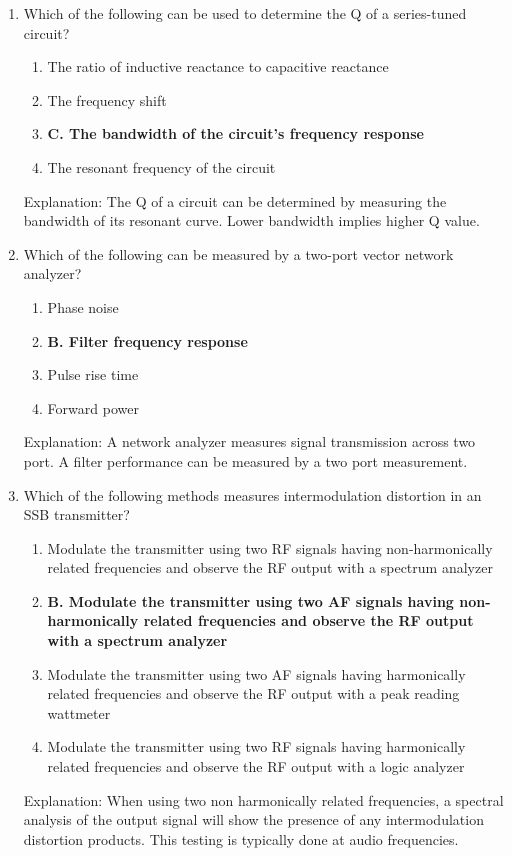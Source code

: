 \begin{enumerate}
      \item Which of the following can be used to determine the Q of a series-tuned circuit?
     \begin{enumerate}
       \item  The ratio of inductive reactance to capacitive reactance
       \item  The frequency shift
       \item \textbf{C. The bandwidth of the circuit's frequency response}
       \item  The resonant frequency of the circuit
        \end{enumerate}
       \textcolor{myred}{Explanation:}
    The Q of a circuit can be determined by measuring the bandwidth of its resonant curve. Lower bandwidth implies higher Q value.

        \item Which of the following can be measured by a two-port vector network analyzer?
      \begin{enumerate}
      \item  Phase noise
       \item \textbf{B. Filter frequency response}
      \item  Pulse rise time
        \item  Forward power
        \end{enumerate}
        \textcolor{myred}{Explanation:}
         A network analyzer measures signal transmission across two port. A filter performance can be measured by a two port measurement.
        
     \item Which of the following methods measures intermodulation distortion in an SSB transmitter?
    \begin{enumerate}
       \item  Modulate the transmitter using two RF signals having non-harmonically related frequencies and observe the RF output with a spectrum analyzer
         \item \textbf{B. Modulate the transmitter using two AF signals having non-harmonically related frequencies and observe the RF output with a spectrum analyzer}
    \item  Modulate the transmitter using two AF signals having harmonically related frequencies and observe the RF output with a peak reading wattmeter
       \item  Modulate the transmitter using two RF signals having harmonically related frequencies and observe the RF output with a logic analyzer
        \end{enumerate}
     \textcolor{myred}{Explanation:}
      When using two non harmonically related frequencies, a spectral analysis of the output signal will show the presence of any intermodulation distortion products. This testing is typically done at audio frequencies.


\end{enumerate}
